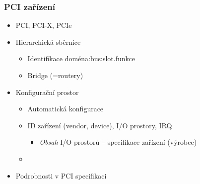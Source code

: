 
\begin{frame}
  \frametitle{PCI zařízení}

  \begin{itemize}
    \item PCI, PCI-X, PCIe

    \pause

    \item Hierarchická sběrnice
    \begin{itemize}
      \item Identifikace doména:bus:slot.funkce
      \item Bridge (=routery)
    \end{itemize}

    \pause

    \item Konfigurační prostor
    \begin{itemize}
      \item Automatická konfigurace

      \item ID zařízení (vendor, device), I/O prostory, IRQ
      \begin{itemize}
	\item \emph{Obsah} I/O prostorů -- specifikace zařízení (výrobce)
      \end{itemize}

      \item {}
    \end{itemize}

    \pause

    \item Podrobnosti v PCI specifikaci
  \end{itemize}

\end{frame}

